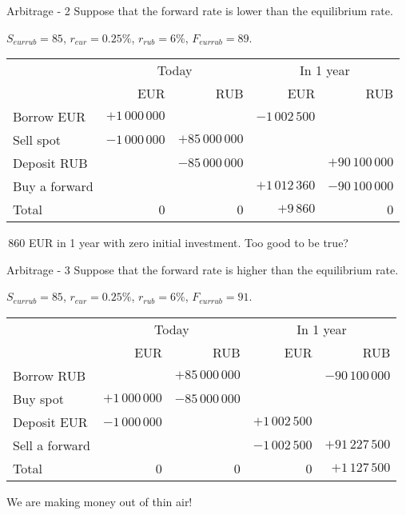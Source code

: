 \documentclass{beamer}
\begin{document}
\begin{frame}{Arbitrage - 2}
\justify
Suppose that the forward rate is lower than the equilibrium rate.

$S_{eurrub}=85$, $r_{eur}=0.25\%$, $r_{rub}=6\%$, $F_{eurrub}=89$. 

\justify
\centering
\small{
\begin{tabular}{l|r|r|r|r}
& \multicolumn{2}{c|}{Today} & \multicolumn{2}{c}{In 1 year} \\ \cline{2-5}
& EUR & RUB & EUR & RUB \\ \hline
Borrow EUR     & $+1\,000\,000$ &                                   & $-1\,002\,500$ & \\
Sell spot            & $-1\,000\,000$ & $+85\,000\,000$ &                               & \\
Deposit RUB    &                                & $-85\,000\,000$  &                                & $+90\,100\,000$ \\
Buy a forward &                               &                                 & $+1\,012\,360$ & $-90\,100\,000$ \\ \hline
Total & 0 & 0 & $+9\,860$ & 0
\end{tabular}
}

\,860 EUR in 1 year with zero initial investment. Too good to be true?
\end{frame}



\begin{frame}{Arbitrage -  3}
\justify
Suppose that the forward rate is higher than the equilibrium rate.

 $S_{eurrub}=85$, $r_{eur}=0.25\%$, $r_{rub}=6\%$, $F_{eurrub}=91$. 

\justify
\centering
\small{
\begin{tabular}{l|r|r|r|r}
& \multicolumn{2}{c|}{Today} & \multicolumn{2}{c}{In 1 year} \\ \cline{2-5}
& EUR & RUB & EUR & RUB \\ \hline
Borrow RUB     &                               & $+85\,000\,000$  &                            & $-90\,100\,000$  \\
Buy spot            & $+1\,000\,000$ & $-85\,000\,000$ &                               &   \\
Deposit EUR    &  $-1\,000\,000$  &                                 & $+1\,002\,500$ &  \\
Sell a forward &                               &                                & $-1\,002\,500$ & $+91\,227\,500$ \\ \hline
Total & 0 & 0 & 0 & $+1\,127\,500$
\end{tabular}
}

\justify
We are making money out of thin air!
\end{frame}
\end{document}
